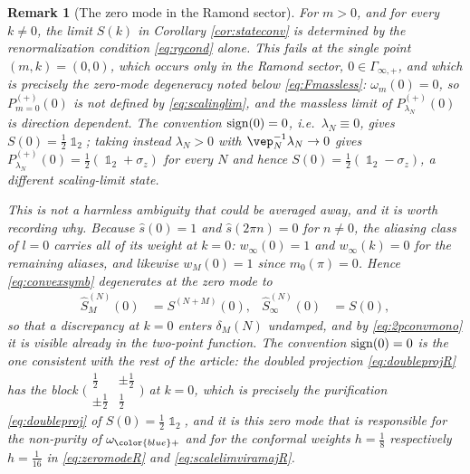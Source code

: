 \documentclass[a4paper, 11pt]{article}
\DeclareMathOperator{\1}{\mathds{1}}
\DeclareMathOperator{\sign}{\textup{sign}}
\newtheorem{rem}[thm]{Remark}
\begin{document}
\begin{rem}[The zero mode in the Ramond sector]
\label{rem:zeromode}
For $m>0$, and for every $k\neq0$, the limit $S(k)$ in Corollary \ref{cor:stateconv} is determined by the renormalization condition \eqref{eq:rgcond} alone. This fails at the single point $(m,k)=(0,0)$, which occurs only in the Ramond sector, $0\in\Gamma_{\infty,+}$, and which is precisely the zero-mode degeneracy noted below \eqref{eq:Fmassless}: $\omega_{m}(0)=0$, so $P^{(+)}_{m=0}(0)$ is not defined by \eqref{eq:scalinglim}, and the massless limit of $P^{(+)}_{\lambda_{N}}(0)$ is direction dependent. The convention $\sign(0)=0$, i.e.~$\lambda_{N}\equiv0$, gives $S(0)=\tfrac{1}{2}\1_{2}$; taking instead $\lambda_{N}>0$ with $\vep_{N}^{-1}\lambda_{N}\rightarrow0$ gives $P^{(+)}_{\lambda_{N}}(0) = \tfrac{1}{2}(\1_{2}+\sigma_{z})$ for \emph{every} $N$ and hence $S(0)=\tfrac{1}{2}(\1_{2}-\sigma_{z})$, a different scaling-limit state.

This is not a harmless ambiguity that could be averaged away, and it is worth recording why. Because $\hat{s}(0)=1$ and $\hat{s}(2\pi n)=0$ for $n\neq0$, the aliasing class of $l=0$ carries \emph{all} of its weight at $k=0$: $w_{\infty}(0)=1$ and $w_{\infty}(k)=0$ for the remaining aliases, and likewise $w_{M}(0)=1$ since $m_{0}(\pi)=0$. Hence \eqref{eq:convexsymb} degenerates at the zero mode to
\begin{align*}
\hat{S}^{(N)}_{M}(0) & = S^{(N+M)}(0), & \hat{S}^{(N)}_{\infty}(0) & = S(0),
\end{align*}
so that a discrepancy at $k=0$ enters $\delta_{M}(N)$ undamped, and by \eqref{eq:2pconvmono} it is visible already in the two-point function. The convention $\sign(0)=0$ is the one consistent with the rest of the article: the doubled projection \eqref{eq:doubleprojR} has the block $\big(\begin{smallmatrix}\frac{1}{2} & \pm\frac{1}{2}\\ \pm\frac{1}{2} & \frac{1}{2}\end{smallmatrix}\big)$ at $k=0$, which is precisely the purification \eqref{eq:doubleproj} of $S(0)=\tfrac{1}{2}\1_{2}$, and it is this zero mode that is responsible for the non-purity of $\omega_{{\color{blue}+}}$ and for the conformal weights $h=\tfrac{1}{8}$ respectively $h=\tfrac{1}{16}$ in \eqref{eq:zeromodeR} and \eqref{eq:scalelimviramajR}.
\end{rem}
\end{document}
